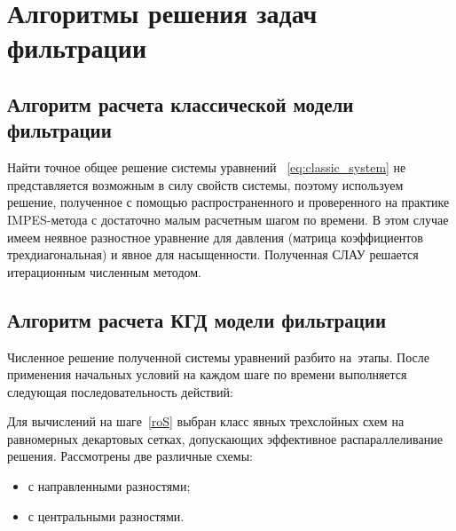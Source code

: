 \chapter{Алгоритмы решения задач фильтрации} \label{ch:ch2}

\section{Алгоритм расчета классической модели фильтрации} \label{sec:ch2/sec1}

Найти точное общее решение системы уравнений ~\eqref{eq:classic_system} не представляется возможным в силу свойств системы, поэтому используем решение, полученное с помощью распространенного и проверенного на практике IMPES-метода с достаточно малым расчетным шагом по времени.
В этом случае имеем неявное разностное уравнение для давления (матрица коэффициентов трехдиагональная) и явное для насыщенности. Полученная СЛАУ решается итерационным численным методом.

\section{Алгоритм расчета КГД модели фильтрации} \label{sec:ch2/sec2}

Численное решение полученной системы уравнений разбито на~этапы. После
применения начальных условий на каждом шаге по времени выполняется следующая
последовательность действий: 
Для вычислений на шаге~\ref{roS} выбран класс явных трехслойных схем на равномерных декартовых сетках,
допускающих эффективное распараллеливание решения.
Рассмотрены две различные схемы:
\begin{itemize}
\item с направленными разностями;
\item с центральными разностями.
\end{itemize}


